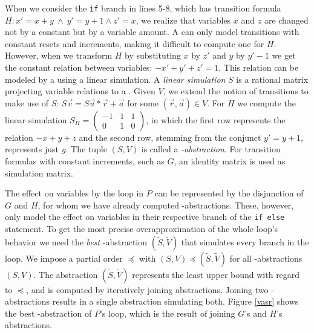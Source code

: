 When we consider the \texttt{if} branch in lines 5-8, which has transition formula \\ $H: x' = x + y\ \land\ y' = y + 1 \land z' = x$, we realize that variables $x$ and $z$ are changed not by a constant but by a variable amount. A \qvasr can only model transitions with constant resets and increments, making it difficult to compute one for $H$. However, when we transform $H$ by substituting $x$ by $z'$ and $y$ by $y'- 1$ we get the constant relation between variables: $-x' + y' + z' = 1$. This relation can be modeled by a \qvasr using a linear simulation. A \textsl{linear simulation} $S$ is a rational matrix projecting variable relations to a \qvasr. Given \qvasr $V$, we extend the notion of transitions to make use of $S$: $S\vec{v} = S\vec{u} * \vec{r} + \vec{a}$ for some $(\vec{r}, \vec{a}) \in V$. For $H$ we compute the linear simulation $S_H = \begin{pmatrix}
	-1 & 1 & 1 \\
	0 & 1 & 0
\end{pmatrix}$, in which the first row represents the relation $-x + y + z$ and the second row, stemming from the conjunct $y' = y + 1$, represents just $y$. The tuple $(S, V)$ is called a \textsl{\qvasr-abstraction}. For transition formulas with constant increments, such as $G$, an identity matrix is used as simulation matrix. \par
The effect on variables by the loop in $P$ can be represented by the disjunction of $G$ and $H$, for whom we have already computed \qvasr-abstractions. These, however, only model the effect on variables in their respective branch of the \texttt{if else} statement. To get the most precise overapproximation of the whole loop's behavior we need the \textsl{best} \qvasr-abstraction $(\tilde{S}, \tilde{V})$ that simulates every branch in the loop.
We impose a partial order $\preceq$ with $(S, V) \preceq (\tilde{S}, \tilde{V})$ for all \qvasr-abstractions $(S, V)$. The abstraction $(\tilde{S}, \tilde{V})$ represents the least upper bound with regard to $\preceq$, and is computed by iteratively joining abstractions. Joining two \qvasr-abstractions results in a single abstraction simulating both. Figure \ref{vasr} shows the best \qvasr-abstraction of $P$'s loop, which is the result of joining $G$'s and $H$'s abstractions. \\


